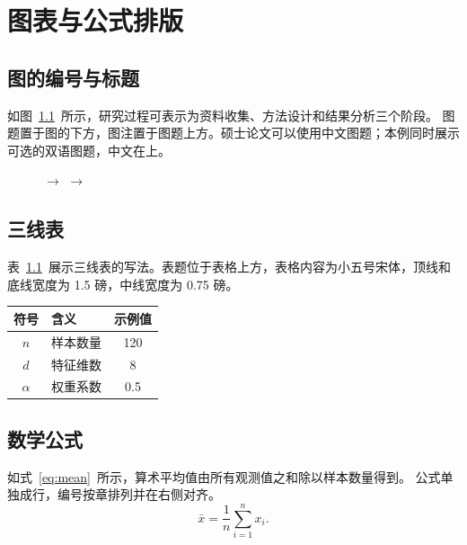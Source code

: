 \chapter{图表与公式排版}
\label{chap:layout}
\section{图的编号与标题}
如图~\ref{fig:workflow}~所示，研究过程可表示为资料收集、方法设计和结果分析三个阶段。
图题置于图的下方，图注置于图题上方。硕士论文可以使用中文图题；本例同时展示可选的双语图题，中文在上。
\begin{figure}[htbp]
  \centering
  \begin{minipage}{0.85\textwidth}
    \centering
    \setlength{\fboxsep}{10pt}
    \quad$\longrightarrow$\quad
    \quad$\longrightarrow$\quad{}
    \medskip
    \label{fig:workflow}
  \end{minipage}
\end{figure}

\section{三线表}
表~\ref{tab:parameters}~展示三线表的写法。表题位于表格上方，表格内容为小五号宋体，顶线和底线宽度为 1.5 磅，中线宽度为 0.75 磅。
\begin{table}[htbp]
  \centering
  \label{tab:parameters}
  \begin{tabular}{clc}
    \toprule
    符号 & 含义 & 示例值 \\
    \midrule
    $n$ & 样本数量 & 120 \\
    $d$ & 特征维数 & 8 \\
    $\alpha$ & 权重系数 & 0.5 \\
    \bottomrule
  \end{tabular}
\end{table}

\section{数学公式}
如式~\eqref{eq:mean}~所示，算术平均值由所有观测值之和除以样本数量得到。
公式单独成行，编号按章排列并在右侧对齐。
\begin{equation}
  \bar{x}=\frac{1}{n}\sum_{i=1}^{n}x_i .
  \label{eq:mean}
\end{equation}

